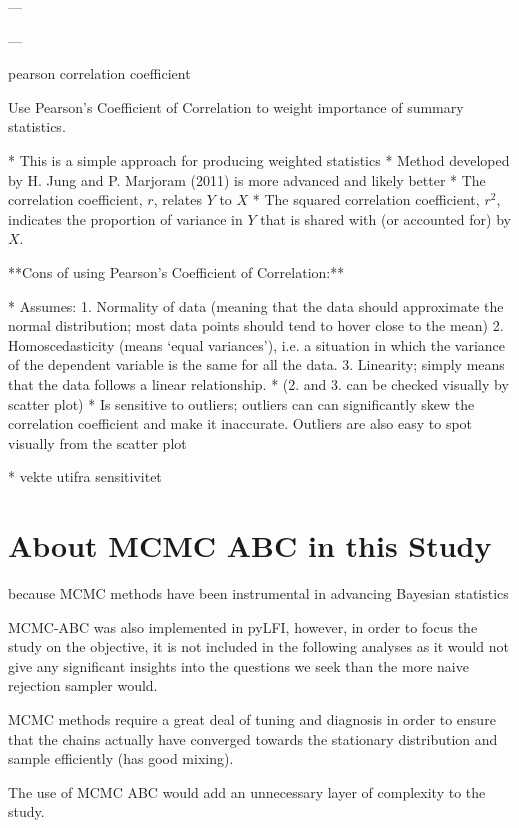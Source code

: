 ---

---

pearson correlation coefficient

Use Pearson's Coefficient of Correlation to weight importance of summary statistics.

* This is a simple approach for producing weighted statistics 
    * Method developed by H. Jung and P. Marjoram (2011) is more advanced and likely better
* The correlation coefficient, $r$, relates $Y$ to $X$ 
* The squared correlation coefficient, $r^2$, indicates the proportion of variance in $Y$ that is shared with (or accounted for) by $X$.

**Cons of using Pearson's Coefficient of Correlation:**

* Assumes:
    1. Normality of data (meaning that the data should approximate the normal distribution; most data points should tend to hover close to the mean)
    2. Homoscedasticity (means ‘equal variances’), i.e. a situation in which the variance of the dependent variable is the same for all the data.
    3. Linearity; simply means that the data follows a linear relationship. 
* (2. and 3. can be checked visually by scatter plot)
* Is sensitive to outliers; outliers can can significantly skew the correlation coefficient and make it inaccurate. Outliers are also easy to spot visually from the scatter plot

* vekte utifra sensitivitet

\section{About MCMC ABC in this Study}

because MCMC methods have been instrumental in advancing Bayesian statistics

MCMC-ABC was also implemented in pyLFI, however, in order to focus the study on the objective, it is not included in the following analyses as it would not give any significant insights into the questions we seek than the more naive rejection sampler would. 

MCMC methods require a great deal of tuning and diagnosis in order to ensure that the chains actually have converged towards the stationary distribution and sample efficiently (has good mixing).

The use of MCMC ABC would add an unnecessary layer of complexity to the study.

